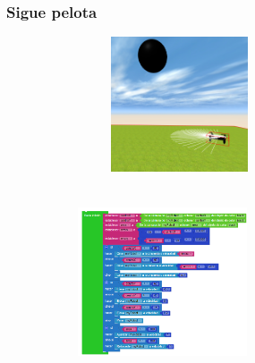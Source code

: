 \documentclass[xcolor={table}]{beamer}
\begin{document}
		\begin{frame}
			\frametitle{Sigue pelota}
        \begin{figure}[H]
        \centering
        \begin{subfigure}{\textwidth}
            \includegraphics[width=6cm, height=4cm]{img/followBallTello12.png}
        \label{fig:followBall}
        \end{subfigure}\hfill
        \begin{subfigure}{\textwidth}
            \includegraphics[width=5cm, height=5.5cm]{img/siguepelotacodigo.png}
        \label{fig:siguepelotacodigo}
        \end{subfigure}\hfill
        \label{fig:siguepelota}
        \end{figure}
 		\end{frame}
	
\end{document}

